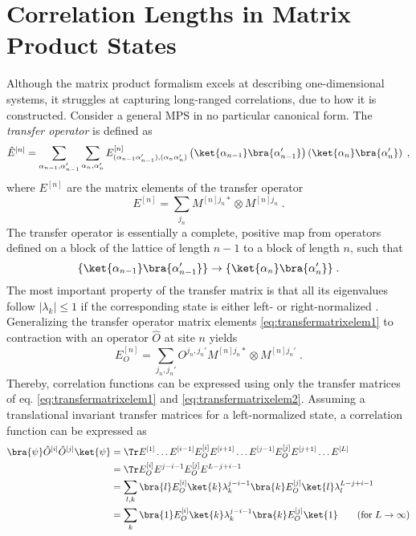 \chapter{Correlation Lengths in Matrix Product States} \label{sec:CorrelationLength}
Although the matrix product formalism excels at describing one-dimensional systems, it struggles at capturing long-ranged correlations, due to how it is constructed.
Consider a general MPS in no particular canonical form. The \textit{transfer operator} is defined as
\begin{equation}
	\hat{E}^{[n]} = \sum_{\alpha_{n-1}, \alpha_{n-1}'} \sum_{\alpha_{n}, \alpha_{n}'} E_{(\alpha_{n-1} \alpha_{n-1}'),(\alpha_{n}  \alpha_{n}')}^{[n]} \left( \ket{\alpha_{n-1}}\bra{\alpha_{n-1}'} \right) \left( \ket{\alpha_{n}}\bra{\alpha_{n}'} \right) \; ,
\end{equation}   
where $E^{[n]}$ are the matrix elements of the transfer operator
\begin{equation}
	E^{[n]} = \sum_{j_n} M^{[n] j_n *} \otimes M^{[n] j_n}  \; . \label{eq:transfermatrixelem1}
\end{equation}
The transfer operator is essentially a complete, positive map from operators defined on a block of the lattice of length $n-1$ to a block of length $n$, such that
\begin{equation}
	\{ \ket{\alpha_{n-1}}\bra{\alpha_{n-1}'} \} \to \{ \ket{\alpha_{n}}\bra{\alpha_{n}'} \} \; .
\end{equation}
The most important property of the transfer matrix is that all its eigenvalues follow $|\lambda_k| \leq 1 $ if the corresponding state is either left- or right-normalized \cite{schollwock}. \\
Generalizing the transfer operator matrix elements \eqref{eq:transfermatrixelem1} to contraction with an operator $\hat{O}$ at site $n$ yields 
\begin{equation}
	E_{O}^{[n]} = \sum_{j_n , j_n '} O^{j_n , j_n '} M^{[n] j_n *} \otimes  M^{[n] j_n '} \; . \label{eq:transfermatrixelem2}
\end{equation}
Thereby, correlation functions can be expressed using only the transfer matrices of eq. \eqref{eq:transfermatrixelem1} and \eqref{eq:transfermatrixelem2}. Assuming a translational invariant transfer matrices for a left-normalized state, a correlation function can be expressed as  
\begin{align}
	\bra{\psi} \hat{O}^{[i]} \hat{O}^{[j]} \ket{\psi} &= \Tr E^{[1]} \ldots E^{[i-1]} E_{O}^{[i]} E^{[i+1]} \ldots E^{[j-1]} E_{O}^{[j]} E^{[j+1]} \ldots E^{[L]} \nonumber \\
	&= \Tr E_{O}^{[i]} E^{j-i-1} E_{O}^{[j]} E^{L-j+i-1} \nonumber \\ 
	&= \sum_{l , k} \bra{l} E_{O}^{[i]} \ket{k} \lambda_{k}^{j-i-1} \bra{k} E_{O}^{[j]} \ket{l} \lambda_{l}^{L-j+i-1} \nonumber \\ 
	&= \sum_{k} \bra{1} E_{O}^{[i]} \ket{k} \lambda_{k}^{j-i-1} \bra{k} E_{O}^{[j]} \ket{1} \qquad (\mathrm{for } \; L \to \infty)
\end{align}
